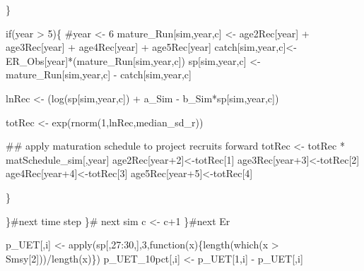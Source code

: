 \documentclass[
  11pt,
]{article}
\newenvironment{Shaded}{}{}
\newcommand{\CommentTok}[1]{\textcolor[rgb]{0.00,0.50,0.00}{#1}}
\newcommand{\ControlFlowTok}[1]{\textcolor[rgb]{0.00,0.00,1.00}{#1}}
\newcommand{\DecValTok}[1]{#1}
\newcommand{\KeywordTok}[1]{\textcolor[rgb]{0.00,0.00,1.00}{#1}}
\newcommand{\NormalTok}[1]{#1}
\newcommand{\OperatorTok}[1]{#1}
\newcommand{\StringTok}[1]{\textcolor[rgb]{0.00,0.50,0.50}{#1}}
\begin{document}
\begin{Shaded}
\begin{Highlighting}[]
{\NormalTok{          \}}
          
          \ControlFlowTok{if}\NormalTok{(year }\OperatorTok{>}\StringTok{ }\DecValTok{5}\NormalTok{)\{}
            \CommentTok{#year <- 6}
\NormalTok{            mature_Run[sim,year,c] <-}\StringTok{ }\NormalTok{age2Rec[year] }\OperatorTok{+}\StringTok{ }\NormalTok{age3Rec[year] }\OperatorTok{+}\StringTok{ }\NormalTok{age4Rec[year] }\OperatorTok{+}\StringTok{ }\NormalTok{age5Rec[year]}
\NormalTok{            catch[sim,year,c]<-ER_Obs[year]}\OperatorTok{*}\NormalTok{(mature_Run[sim,year,c])}
\NormalTok{            sp[sim,year,c] <-}\StringTok{ }\NormalTok{mature_Run[sim,year,c] }\OperatorTok{-}\StringTok{ }\NormalTok{catch[sim,year,c]}
            
\NormalTok{            lnRec <-}\StringTok{ }\NormalTok{(}\KeywordTok{log}\NormalTok{(sp[sim,year,c]) }\OperatorTok{+}\StringTok{ }\NormalTok{a_Sim }\OperatorTok{-}\StringTok{ }\NormalTok{b_Sim}\OperatorTok{*}\NormalTok{sp[sim,year,c])}
            
\NormalTok{            totRec <-}\StringTok{ }\KeywordTok{exp}\NormalTok{(}\KeywordTok{rnorm}\NormalTok{(}\DecValTok{1}\NormalTok{,lnRec,median_sd_r))}
            
            \CommentTok{## apply maturation schedule to project recruits forward}
\NormalTok{            totRec <-}\StringTok{ }\NormalTok{totRec }\OperatorTok{*}\StringTok{ }\NormalTok{matSchedule_sim[,year]}
\NormalTok{            age2Rec[year}\OperatorTok{+}\DecValTok{2}\NormalTok{]<-totRec[}\DecValTok{1}\NormalTok{]}
\NormalTok{            age3Rec[year}\OperatorTok{+}\DecValTok{3}\NormalTok{]<-totRec[}\DecValTok{2}\NormalTok{]}
\NormalTok{            age4Rec[year}\OperatorTok{+}\DecValTok{4}\NormalTok{]<-totRec[}\DecValTok{3}\NormalTok{]}
\NormalTok{            age5Rec[year}\OperatorTok{+}\DecValTok{5}\NormalTok{]<-totRec[}\DecValTok{4}\NormalTok{]}
            
\NormalTok{          \}}
          
\NormalTok{        \}}\CommentTok{#next time step}
\NormalTok{      \}}\CommentTok{# next sim}
\NormalTok{      c <-}\StringTok{ }\NormalTok{c}\OperatorTok{+}\DecValTok{1}
\NormalTok{    \}}\CommentTok{#next Er}
    
\NormalTok{    p_UET[,i] <-}\StringTok{ }\KeywordTok{apply}\NormalTok{(sp[,}\DecValTok{27}\OperatorTok{:}\DecValTok{30}\NormalTok{,],}\DecValTok{3}\NormalTok{,}\ControlFlowTok{function}\NormalTok{(x)\{}\KeywordTok{length}\NormalTok{(}\KeywordTok{which}\NormalTok{(x }\OperatorTok{>}\StringTok{ }\NormalTok{Smsy[}\DecValTok{2}\NormalTok{]))}\OperatorTok{/}\KeywordTok{length}\NormalTok{(x)\})}
\NormalTok{    p_UET_10pct[,i] <-}\StringTok{ }\NormalTok{p_UET[}\DecValTok{1}\NormalTok{,i] }\OperatorTok{-}\StringTok{ }\NormalTok{p_UET[,i]}
  
}
\end{Highlighting}
\end{Shaded}
\end{document}
